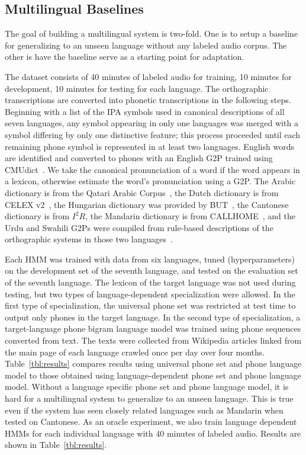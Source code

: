 \subsection{Multilingual Baselines}
\label{sec:mlbaseline}

The goal of building a multilingual system is two-fold.
One is to setup a baseline for generalizing to an unseen
language without any labeled audio corpus.  The other
is have the baseline serve as a starting point for
adaptation.

The dataset consists of 40 minutes of labeled audio for training,
10 minutes for development, 10 minutes for testing
for each language.
The orthographic transcriptions are converted into
phonetic transcriptions in the following steps.
Beginning with a list of the IPA symbols used in canonical descriptions
of all seven languages,
any symbol appearing in only one languages was merged with a symbol
differing by only one distinctive feature; this process proceeded until 
each remaining phone symbol is represented in at least two languages.
English words are identified and converted to phones with
an English G2P trained using CMUdict~\cite{Lenco15}.
We take the canonical pronunciation of a word if the word
appears in a lexicon,
otherwise estimate the word's pronunciation using a G2P.
The Arabic dictionary is from the Qatari Arabic Corpus~\cite{Elmahdy14},
the Dutch dictionary is from CELEX v2~\cite{Baayen96},
the Hungarian dictionary was provided by BUT~\cite{Grezl14},
the Cantonese dictionary is from $I^2R$,
the Mandarin dictionary is from CALLHOME~\cite{Canavan96},
and the Urdu and Swahili G2Ps were compiled from
rule-based descriptions of the orthographic systems in those
two languages~\cite{Hasegawajohnson15}.

Each HMM was trained with data from six languages, tuned
(hyperparameters) on the development set of the seventh language, and
tested on the evaluation set of the seventh language.  The lexicon of
the target language was not used during testing, but two types of
language-dependent specialization were allowed.  In the first type of
specialization, the universal phone set was restricted at test time to
output only phones in the target language.  In the second type of
specialization, a target-language phone bigram language model was
trained using phone sequences converted from text.  The texts were
collected from Wikipedia articles linked from the main page of each
language crawled once per day over four months.
Table~\ref{tbl:results} compares results using universal phone set and
phone language model to those obtained using language-dependent phone
set and phone language model.  Without a language specific phone set
and phone language model, it is hard for a multilingual system to
generalize to an unseen language.  This is true even if the system has
seen closely related languages such as Mandarin when tested on
Cantonese.  As an oracle experiment, we also train language dependent
HMMs for each individual language with 40 minutes of labeled audio.
Results are shown in Table~\ref{tbl:results}.

